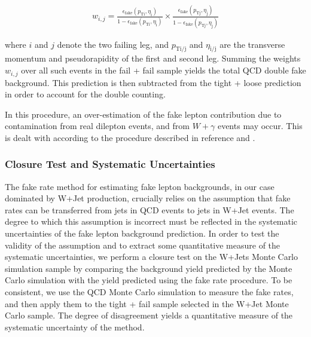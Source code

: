 \begin{eqnarray}
  w_{i,j} = \frac{\epsilon_{\mathrm{fake}}(p_{\mathrm{T i}},\eta_{\mathrm{i}})}{1 - \epsilon_{\mathrm{fake}}(p_{\mathrm{T i}},\eta_{\mathrm{i}})} \times \frac{\epsilon_{\mathrm{fake}}(p_{\mathrm{T j}},\eta_{\mathrm{j}})}{1 - \epsilon_{\mathrm{fake}}(p_{\mathrm{T j}},\eta_{\mathrm{j}})}
\end{eqnarray}

where $i$ and $j$ denote the two failing leg, and $p_{\mathrm{T i/j}}$ and $\eta_{\mathrm{i/j}}$
are the transverse momentum and pseudorapidity of the first and second leg.
Summing the weights $w_{i,j}$ over all such events in the fail + fail sample yields
the total QCD double fake background. This prediction is then subtracted from the
tight + loose prediction in order to account for the double counting. 

In this procedure, an over-estimation of the fake lepton contribution due to contamination
from real dilepton events, and from $W+\gamma$ events may occur. This is dealt with 
according to the procedure described in reference \cite{fakeLeptonNote1} and 
\cite{fakeLeptonBkgSpillage1}.


\subsubsection{Closure Test and Systematic Uncertainties}
\label{sec:fakerateSystematics}

The fake rate method for estimating fake lepton backgrounds, in our case
dominated by W+Jet production, crucially relies on the assumption that
fake rates can be transferred from jets in QCD events to jets in W+Jet
events. The degree to which this assumption is incorrect must be 
reflected in the systematic uncertainties of the fake lepton 
background prediction. In order to test the validity of the assumption
and to extract some quantitative measure of the systematic uncertainties,
we perform a closure test on the W+Jets Monte Carlo simulation sample by 
comparing the background yield predicted by the Monte Carlo simulation
with the yield predicted using the fake rate procedure. To be consistent,
we use the QCD Monte Carlo simulation to measure the fake rates, and then
apply them to the tight + fail sample selected in the W+Jet Monte Carlo
sample. The degree of disagreement yields a quantitative measure of the 
systematic uncertainty of the method.

